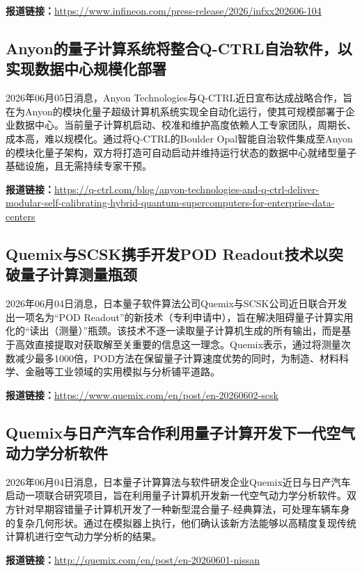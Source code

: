 \documentclass[12pt,a4paper]{ctexart}
\begin{document}
\noindent\textbf{报道链接：}\url{https://www.infineon.com/press-release/2026/infxx202606-104}

\subsection{ Anyon的量子计算系统将整合Q-CTRL自治软件，以实现数据中心规模化部署 }

2026年06月05日消息，Anyon Technologies与Q-CTRL近日宣布达成战略合作，旨在为Anyon的模块化量子超级计算机系统实现全自动化运行，使其可规模部署于企业数据中心。当前量子计算机启动、校准和维护高度依赖人工专家团队，周期长、成本高，难以规模化。通过将Q-CTRL的Boulder Opal智能自治软件集成至Anyon的模块化量子架构，双方将打造可自动启动并维持运行状态的数据中心就绪型量子基础设施，且无需持续专家干预。

\noindent\textbf{报道链接：}\url{https://q-ctrl.com/blog/anyon-technologies-and-q-ctrl-deliver-modular-self-calibrating-hybrid-quantum-supercomputers-for-enterprise-data-centers}

\subsection{ Quemix与SCSK携手开发POD Readout技术以突破量子计算测量瓶颈 }

2026年06月04日消息，日本量子软件算法公司Quemix与SCSK公司近日联合开发出一项名为“POD Readout”的新技术（专利申请中），旨在解决阻碍量子计算实用化的“读出（测量）”瓶颈。该技术不逐一读取量子计算机生成的所有输出，而是基于高效直接提取对获取解至关重要的信息这一理念。Quemix表示，通过将测量次数减少最多1000倍，POD方法在保留量子计算速度优势的同时，为制造、材料科学、金融等工业领域的实用模拟与分析铺平道路。

\noindent\textbf{报道链接：}\url{https://www.quemix.com/en/post/en-20260602-scsk}

\subsection{ Quemix与日产汽车合作利用量子计算开发下一代空气动力学分析软件 }

2026年06月04日消息，日本量子计算算法与软件研发企业Quemix近日与日产汽车启动一项联合研究项目，旨在利用量子计算机开发新一代空气动力学分析软件。双方针对早期容错量子计算机开发了一种新型混合量子-经典算法，可处理车辆车身的复杂几何形状。通过在模拟器上执行，他们确认该新方法能够以高精度复现传统计算机进行空气动力学分析的结果。

\noindent\textbf{报道链接：}\url{http://quemix.com/en/post/en-20260601-nissan}
\end{document}
